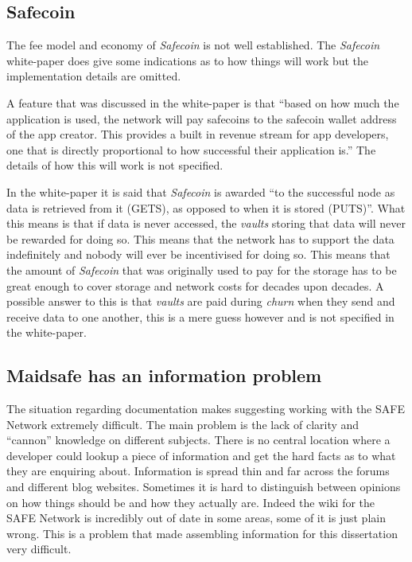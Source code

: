 \subsection{Safecoin}
\label{subsec:problem-safecoin}

The fee model and economy of \textit{Safecoin} is not well established. The \textit{Safecoin} white-paper\cite{lambert2015safecoin} does give some indications as to how things will work but the implementation details are omitted.

A feature that was discussed in the white-paper is that ``based on how much the application is used, the network will pay safecoins to the safecoin wallet address of the app creator. This provides a built in revenue stream for app developers, one that is directly proportional to how successful their application is.'' The details of how this will work is not specified.

In the white-paper it is said that \textit{Safecoin} is awarded ``to the successful node as data is retrieved from it (GETS), as opposed to when it is stored (PUTS)''. What this means is that if data is never accessed, the \textit{vaults} storing that data will never be rewarded for doing so. This means that the network has to support the data indefinitely and nobody will ever be incentivised for doing so. This means that  the amount of \textit{Safecoin} that was originally used to pay for the storage has to be great enough to cover storage and network costs for decades upon decades. A possible answer to this is that \textit{vaults} are paid during \textit{churn} when they send and receive data to one another, this is a mere guess however and is not specified in the white-paper.

\subsection{Maidsafe has an information problem}

The situation regarding documentation makes suggesting working with the SAFE Network extremely difficult. The main problem is the lack of clarity and ``cannon'' knowledge on different subjects. There is no central location where a developer could lookup a piece of information and get the hard facts as to what they are enquiring about. Information is spread thin and far across the forums and different blog websites. Sometimes it is hard to distinguish between opinions on how things should be and how they actually are. Indeed the wiki for the SAFE Network is incredibly out of date in some areas, some of it is just plain wrong. This is a problem that made assembling information for this dissertation very difficult.

